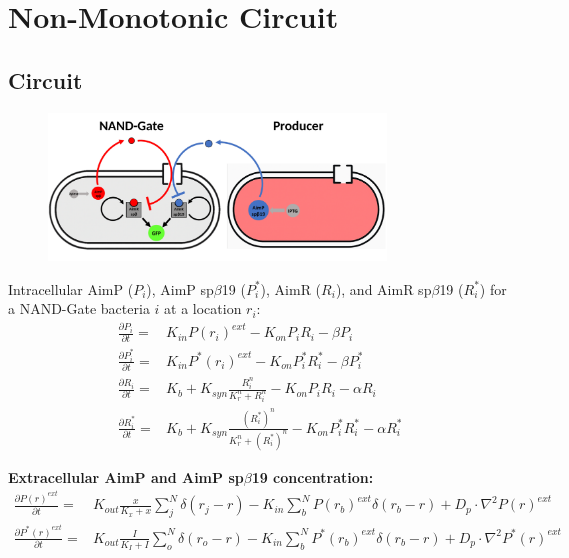 \documentclass[11pt,a4paper]{article}
\begin{document}
\section{Non-Monotonic Circuit}

\subsection{Circuit}

\begin{figure}[H]
    \centering
    \includegraphics[width=0.8\textwidth]{../figures/nonMonDia.png}
    \label{fig:mono_dec_schematic}
\end{figure}



Intracellular AimP ($P_i$), AimP sp$\beta$19 ($P^*_i$), AimR ($R_i$), and AimR sp$\beta$19 ($R^*_i$) for a NAND-Gate bacteria $i$ at a location $r_i$:
\begin{align*}
\frac{\partial P_i}{\partial t} =& K_{in} P(r_i)^{ext} - K_{on} P_i R_i - \beta P_i\\
\frac{\partial P^*_i}{\partial t} =& K_{in} P^*(r_i)^{ext} - K_{on} P^*_i R^*_i - \beta P^*_i\\
\frac{\partial R_i}{\partial t} =& K_b + K_{syn}  \frac{R_i^n}{K_r^n + R_i^n} - K_{on} P_i R_i - \alpha R_i\\
\frac{\partial R^*_i}{\partial t} =& K_b + K_{syn}  \frac{(R^*_i)^n}{K_r^n + (R^*_i)^n} - K_{on} P^*_i R^*_i - \alpha R^*_i
\end{align*}

\textbf{Extracellular AimP and AimP sp$\beta$19  concentration:}
\begin{align*}
\frac{\partial P(r)^{ext}}{\partial t} =& K_{out} \frac{x}{K_x + x}\sum_{j}^{N} \delta(r_j - r) - K_{in} \sum_{b}^{N} P(r_b)^{ext}\delta(r_b - r)+ D_p \cdot \nabla^2 P(r)^{ext}\\
\frac{\partial P^*(r)^{ext}}{\partial t} =& K_{out} \frac{I}{K_{I} + I} \sum_{o}^{N} \delta(r_o - r)  - K_{in} \sum_{b}^{N} P^*(r_b)^{ext}\delta(r_b - r)+ D_p \cdot \nabla^2 P^*(r)^{ext}
\end{align*}
 
\end{document}
